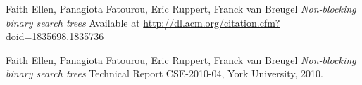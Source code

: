\documentclass[a4paper]{article}
\begin{document}


\begin{thebibliography}{5}

 Faith Ellen, Panagiota Fatourou, Eric Ruppert, Franck van Breugel
\textit{Non-blocking binary search trees} Available at
\url{http://dl.acm.org/citation.cfm?doid=1835698.1835736}

 Faith Ellen, Panagiota Fatourou, Eric Ruppert, Franck van Breugel
\textit{Non-blocking binary search trees} Technical Report CSE-2010-04, York University, 2010.

\end{thebibliography}
\end{document}
